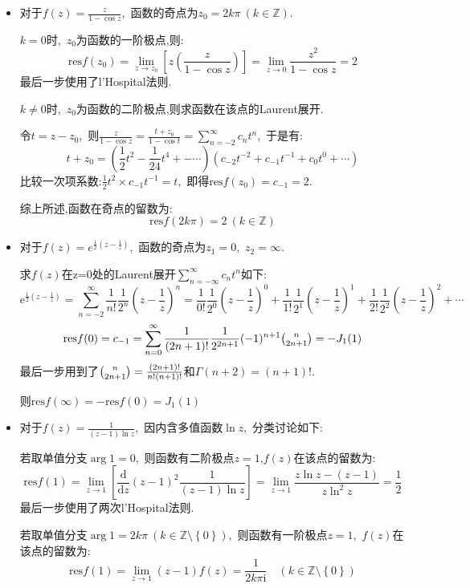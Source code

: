 \documentclass[a4paper,fontset=windows]{ctexart}
\begin{document}
\begin{itemize}
\smallskip
\item[2.(3)]
对于$f(z)=\frac{z}{1-\cos z}$,\ 函数的奇点为$z_0=2k\pi\ (k\in \mathbb{Z})$.

$k=0$时,\ $z_0$为函数的一阶极点,则:
\[
\mathrm{res}f(z_0)
={\lim_{z \to z_0}}\left[z\left(\frac{z}{1-\cos z}\right)\right]
={\lim_{z \to 0}}\frac{z^2}{1-\cos z}
=2
\]
最后一步使用了l'Hospital法则.

$k\neq0$时,\ $z_0$为函数的二阶极点,则求函数在该点的Laurent展开.

令$t=z-z_0$,\ 则$\frac{z}{1-\cos z}=\frac{t+z_0}{1-\cos t}=\sum_{n=-2}^{\infty}{c_nt^n}$,\ 于是有:
\[
t+z_0
=\left(\frac{1}{2}t^2-\frac{1}{24}t^4+-\dotsb\right)\left(c_{-2}t^{-2}+c_{-1}t^{-1}+c_0t^0+\dotsb\right)
\]
比较一次项系数:$\frac{1}{2}t^2\times c_{-1}t^{-1}=t$,\ 即得$\mathrm{res}f(z_0)=c_{-1}=2$.

综上所述,函数在奇点的留数为:
\[
\mathrm{res}f(2k\pi)
=2\ (k\in \mathbb{Z})
\]

\smallskip
\item[2.(5)]
对于$f(z)=e^{\frac{1}{2}\left(z-\frac{1}{z}\right)}$,\ 函数的奇点为$z_1=0$,\ $z_2=\infty$.

求$f(z)$在z=0处的Laurent展开$\sum_{n=-\infty}^{\infty}{c_nt^n}$如下:
\[
\mathrm{e}^{\frac{1}{2}\left(z-\frac{1}{z}\right)}
=\sum_{n=-2}^{\infty}\frac{1}{n!}\frac{1}{2^n}\left(z-\frac{1}{z}\right)^n
=\frac{1}{0!}\frac{1}{2^0}\left(z-\frac{1}{z}\right)^0 +\frac{1}{1!}\frac{1}{2^1}\left(z-\frac{1}{z}\right)^1 +\frac{1}{2!}\frac{1}{2^2}\left(z-\frac{1}{z}\right)^2+\dotsb
\]
\[
\mathrm{res}f(0)=c_{-1}=\sum_{n=0}^{\infty}\frac{1}{(2n+1)!}\frac{1}{2^{2n+1}}(-1)^{n+1}\tbinom{n}{2n+1}=-J_1(1)
\]
最后一步用到了$\tbinom{n}{2n+1}=\frac{(2n+1)!}{n!(n+1)!}$和$\Gamma(n+2)=(n+1)!$.

则$\mathrm{res}f(\infty)=-\mathrm{res}f(0)=J_1(1)$

\smallskip
\item[2.(7)]
对于$f(z)=\frac{1}{(z-1)\ln z}$,\ 因内含多值函数$\ln z$,\ 分类讨论如下:

若取单值分支$\arg 1=0$,\ 则函数有二阶极点$z=1$,$f(z)$在该点的留数为:
\[
\mathrm{res}f(1)
={\lim_{z \to 1}}\left[\frac{\mathrm{d}}{\mathrm{d}z}(z-1)^2\frac{1}{(z-1)\ln z}\right]
={\lim_{z \to 1}}\frac{z\ln z-(z-1)}{z\ln^2 z}
=\frac{1}{2}
\]
最后一步使用了两次l'Hospital法则.

若取单值分支$\arg 1=2k\pi\ (k\in \mathbb{Z}\setminus\left\lbrace 0\right\rbrace )$,\ 则函数有一阶极点$z=1$,\ $f(z)$在该点的留数为:
\[
\mathrm{res}f(1)
={\lim_{z \to 1}}(z-1)f(z)
=\frac{1}{2k\pi \mathrm{i}}\quad (k\in \mathbb{Z}\setminus\left\lbrace 0\right\rbrace )
\]


\end{itemize}
\end{document}
